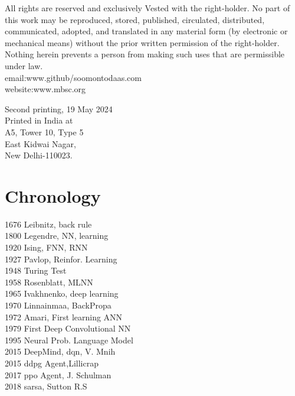 \documentclass[]{article}
\begin{document}
\par All rights are reserved and exclusively
Vested with the right-holder. No part of this work may be reproduced, stored, published, circulated, distributed, communicated, adopted, and translated in any material form (by electronic or mechanical means) without the prior written permission of the right-holder. Nothing herein prevents a person from making such uses that are permissible under law.\\
email:www.github/soomontodaas.com\\
website:www.mbsc.org\\
\vspace{5mm}

Second printing, 19 May 2024\\ Printed in India at\\ A5, Tower 10, Type 5\\East Kidwai Nagar,\\New Delhi-110023.




\newpage
\RaggedRight
\section*{Chronology \cite{schmidhuber2022annotated}}
\normalsize
1676 Leibnitz, back rule \\
1800 Legendre, NN,  learning\\
1920 Ising, FNN, RNN\\
1927 Pavlop, Reinfor. Learning\\
1948 Turing Test\\
1958 Rosenblatt, MLNN\\
1965 Ivakhnenko, deep learning\\
1970 Linnainmaa, BackPropa\\
1972 Amari, First learning ANN\\
1979 First Deep Convolutional NN \\
1995 Neural Prob. Language Model\\
2015 DeepMind, \acrshort{dqn}, V. Mnih\\
2015 \acrshort{ddpg} Agent,Lillicrap\\
2017 \acrshort{ppo} Agent, J. Schulman\\
2018 \acrshort{sarsa}, Sutton R.S\\ 


\newpage
\pagestyle{fancy}
\fancyhead{}\fancyfoot{}
\fancyfoot[C]{ \thepage}
\renewcommand{\headrulewidth}{0pt}
\renewcommand{\footrulewidth}{0pt}
\end{document}
